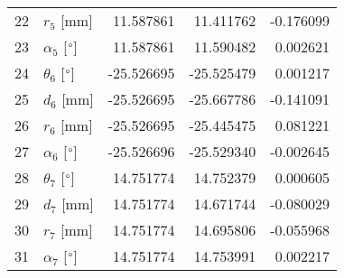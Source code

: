 \documentclass{standalone}%
\begin{document}
\begin{tabular}{llrrr}
22 &              $r_{5}$ [mm] &  11.587861 &  11.411762 &  -0.176099 \\
23 &  $\alpha_{5}$ [$\degree$] &  11.587861 &  11.590482 &   0.002621 \\
24 &  $\theta_{6}$ [$\degree$] & -25.526695 & -25.525479 &   0.001217 \\
25 &              $d_{6}$ [mm] & -25.526695 & -25.667786 &  -0.141091 \\
26 &              $r_{6}$ [mm] & -25.526695 & -25.445475 &   0.081221 \\
27 &  $\alpha_{6}$ [$\degree$] & -25.526696 & -25.529340 &  -0.002645 \\
28 &  $\theta_{7}$ [$\degree$] &  14.751774 &  14.752379 &   0.000605 \\
29 &              $d_{7}$ [mm] &  14.751774 &  14.671744 &  -0.080029 \\
30 &              $r_{7}$ [mm] &  14.751774 &  14.695806 &  -0.055968 \\
31 &  $\alpha_{7}$ [$\degree$] &  14.751774 &  14.753991 &   0.002217 \\
\bottomrule
\end{tabular}
%
\end{document}
